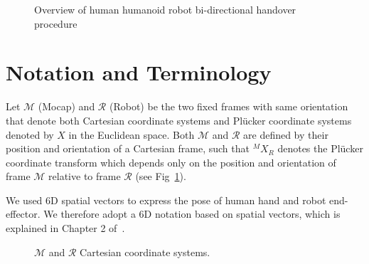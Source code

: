 \documentclass[a4paper, 12pt, oneside]{Thesis}  %
\begin{document}
\begin{figure}[htp]
	\caption{Overview of human humanoid robot bi-directional handover procedure}
\end{figure}



\clearpage
\section{Notation and Terminology}
Let $\mathcal{M}$ (Mocap) and $\mathcal{R}$ (Robot) be the two fixed frames with same orientation that denote both Cartesian coordinate systems and Pl\"ucker coordinate systems denoted by $X$ in the Euclidean space. Both $\mathcal{M}$ and $\mathcal{R}$ are defined by their position and orientation of a Cartesian frame, such that ${}^MX_R$ denotes the Pl\"ucker coordinate transform which depends only on the position and orientation of frame $\mathcal{M}$ relative to frame $\mathcal{R}$ (see Fig~\ref{fig:frames}).

We used 6D spatial vectors to express the pose of human hand and robot end-effector. We therefore adopt a 6D notation based on spatial vectors, which is explained in Chapter 2 of~\cite{featherstone2014rigid}. 


\begin{figure}[ht]
	\caption{$\mathcal{M}$ and $\mathcal{R}$ Cartesian coordinate systems.}
	\label{fig:frames}
\end{figure}
\end{document}
